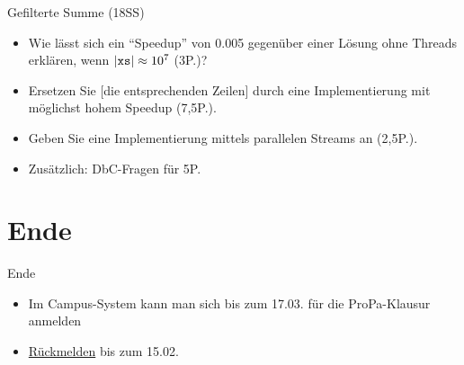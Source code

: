 \documentclass{beamer}
\newcommand{\code}[1]{
	\begin{mdframed}
		
	\end{mdframed}
}
\begin{document}
\begin{frame}{Gefilterte Summe (18SS)}
	\code{code/filteredsum.pseudo}

	\begin{itemize}
		\item Wie lässt sich ein \enquote{Speedup} von 0.005 gegenüber einer Lösung ohne Threads erklären, wenn $|\textrm{\texttt{xs}}| \approx 10^7$ (3P.)?
		\item Ersetzen Sie [die entsprechenden Zeilen] durch eine Implementierung mit möglichst hohem Speedup (7,5P.).
		\item Geben Sie eine Implementierung mittels parallelen Streams an (2,5P.).
		\item Zusätzlich: DbC-Fragen für 5P.
	\end{itemize}
\end{frame}

\section{Ende}

\begin{frame}{Ende}
	\begin{itemize}
		\item Im Campus-System kann man sich bis zum 17.03. für die ProPa-Klausur anmelden
		\item \href{https://campus.studium.kit.edu/renewal/payment.php}{Rückmelden} bis zum 15.02.
	\end{itemize}
\end{frame}
\end{document}
